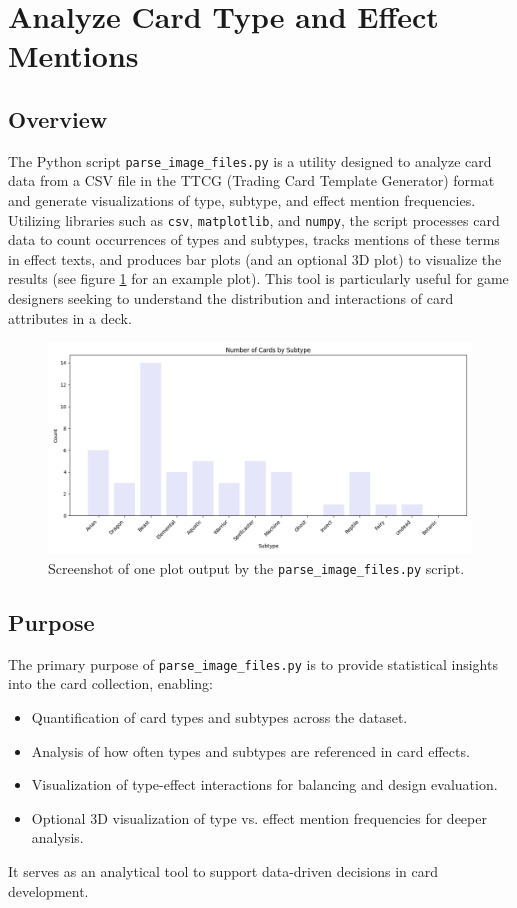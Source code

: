 \section{Analyze Card Type and Effect Mentions}
\subsection{Overview}
The Python script \texttt{parse\_image\_files.py} is a utility designed to analyze card data from a CSV file in the TTCG (Trading Card Template Generator) format and generate visualizations of type, subtype, and effect mention frequencies. Utilizing libraries such as \texttt{csv}, \texttt{matplotlib}, and \texttt{numpy}, the script processes card data to count occurrences of types and subtypes, tracks mentions of these terms in effect texts, and produces bar plots (and an optional 3D plot) to visualize the results (see figure \ref{fig:card_stat_plot} for an example plot). This tool is particularly useful for game designers seeking to understand the distribution and interactions of card attributes in a deck.

\begin{figure}[h]
	\centering
	\includegraphics[width=\textwidth]{images/subtype_counts.png}
	\caption{Screenshot of one plot output by the \texttt{parse\_image\_files.py} script.}
	\label{fig:card_stat_plot}
\end{figure}


\subsection{Purpose}
The primary purpose of \texttt{parse\_image\_files.py} is to provide statistical insights into the card collection, enabling:
\begin{itemize}
	\item Quantification of card types and subtypes across the dataset.
	\item Analysis of how often types and subtypes are referenced in card effects.
	\item Visualization of type-effect interactions for balancing and design evaluation.
	\item Optional 3D visualization of type vs. effect mention frequencies for deeper analysis.
\end{itemize}
It serves as an analytical tool to support data-driven decisions in card development.

